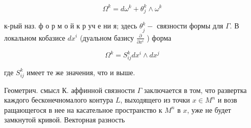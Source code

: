 \documentclass[10pt]{article}
\begin{document}
\[

\Omega^{k}=d \omega^{k}+\theta_{j}^{k} \wedge \omega^{k}

\]



к-рый наз. ф о р м о й к р уч е ни я; здесь $\theta_{\dot{j}}^{k}-$ связности формы для $\Gamma$. В локальном кобазисе $d x^{i}$ (дуальном базису $\frac{\partial}{\partial x^{i}}$ ) форма



\[

\Omega^{k}=S_{i j}^{k} d x^{i} \wedge d x^{j}

\]



где $S_{i j}^{k}$ имеет те же значения, что и выше.



Геометрич. смысл К. аффинной связности $\Gamma$ заключается в том, что развертка каждого бесконечномалого контура $L$, выходящего из точки $x \in M^{n}$ и возв ращающегося в нее на касательное пространство к $M^{n}$ в $x$, уже не будет замкнутой кривой. Векторная разность
\end{document}
